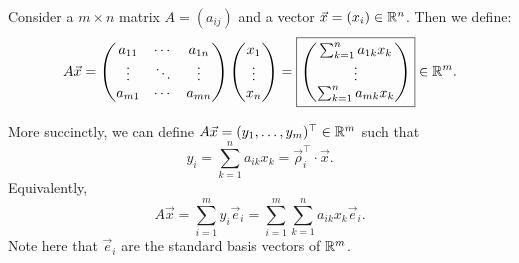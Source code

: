 \documentclass[main.tex]{subfiles}
\begin{document}
\begin{theorem}
    Consider a $m\times n$ matrix $A = (a_{ij})$ and a vector $\vec{x} = (x_i)\in \mathbb R^n$. Then we define:
    \[A\vec{x} = \begin{pmatrix}
    a_{11} & \cdots & a_{1n} \\
    \vdots & \ddots & \vdots \\
    a_{m1} & \cdots & a_{mn}
    \end{pmatrix}\begin{pmatrix} x_1 \\ \vdots \\ x_n\end{pmatrix} = \boxed{\begin{pmatrix}
        \sum_{k = 1}^n a_{1k}x_k \\
        \vdots \\
        \sum_{k = 1}^n a_{mk}x_k
    \end{pmatrix}} \in \mathbb R^m.\]
\end{theorem}

More succinctly, we can define $A\vec{x} = (y_1, \ldots, y_m)^\top\in \mathbb R^m$ such that
\[y_i = \sum_{k = 1}^n a_{ik}x_k = \boxed{\vec{\rho}_i^\top \cdot \vec{x}}.\]
Equivalently,
\[A\vec{x} = \sum_{i = 1}^m y_i\vec{e}_i = \boxed{\sum_{i = 1}^m \sum_{k = 1}^n a_{ik}x_k\vec{e}_i}.\]
Note here that $\vec{e}_i$ are the standard basis vectors of $\mathbb R^m$.
\end{document}
